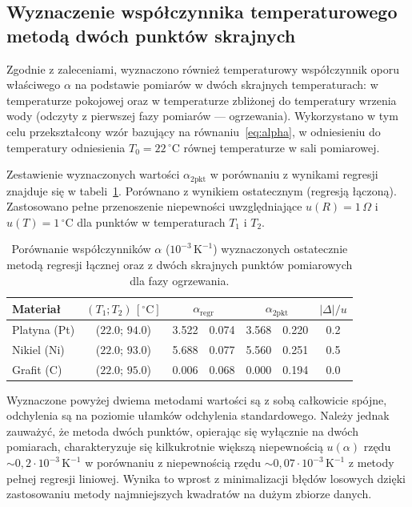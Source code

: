 \documentclass[12pt, a4paper]{article}
\begin{document}
\subsection{Wyznaczenie współczynnika temperaturowego metodą dwóch punktów skrajnych}\label{sec:2pkt}

Zgodnie z zaleceniami, wyznaczono również temperaturowy współczynnik oporu właściwego $\alpha$ na podstawie pomiarów w dwóch skrajnych temperaturach: w temperaturze pokojowej oraz w temperaturze zbliżonej do temperatury wrzenia wody (odczyty z pierwszej fazy pomiarów --- ogrzewania). Wykorzystano w tym celu przekształcony wzór bazujący na równaniu~\eqref{eq:alpha}, w odniesieniu do temperatury odniesienia $T_0 = 22\,^\circ\mathrm{C}$ równej temperaturze w sali pomiarowej. 

Zestawienie wyznaczonych wartości $\alpha_{\mathrm{2pkt}}$ w porównaniu z wynikami regresji znajduje się w tabeli~\ref{tab:alpha_2pkt}. Porównano z wynikiem ostatecznym (regresją łączoną). Zastosowano pełne przenoszenie niepewności uwzględniające $u(R) = 1\,\Omega$ i $u(T) = 1\,^\circ\mathrm{C}$ dla punktów w temperaturach $T_1$ i $T_2$.

\begin{table}[H]
\centering
\caption{Porównanie współczynników $\alpha$ ($10^{-3}\,\mathrm{K}^{-1}$) wyznaczonych ostatecznie metodą regresji łącznej oraz z dwóch skrajnych punktów pomiarowych dla fazy ogrzewania.}\label{tab:alpha_2pkt}
\begin{tabular}{l c r@{$\;\pm\;$}l r@{$\;\pm\;$}l c}
\toprule
Materiał & $(T_1; T_2)\,[^\circ\mathrm{C}]$ & \multicolumn{2}{c}{$\alpha_{\mathrm{regr}}$} & \multicolumn{2}{c}{$\alpha_{\mathrm{2pkt}}$} & $|\Delta|/u$ \\
\midrule
Platyna (Pt) & ($\num{22.0}$; $\num{94.0}$) & \num{3.522} & \num{0.074} & \num{3.568} & \num{0.220} & \num{0.2} \\
Nikiel (Ni)  & ($\num{22.0}$; $\num{93.0}$) & \num{5.688} & \num{0.077} & \num{5.560} & \num{0.251} & \num{0.5} \\
Grafit (C)   & ($\num{22.0}$; $\num{95.0}$) & \num{0.006} & \num{0.068} & \num{0.000} & \num{0.194} & \num{0.0} \\
\bottomrule
\end{tabular}
\end{table}

Wyznaczone powyżej dwiema metodami wartości są z sobą całkowicie spójne, odchylenia są na poziomie ułamków odchylenia standardowego. Należy jednak zauważyć, że metoda dwóch punktów, opierając się wyłącznie na dwóch pomiarach, charakteryzuje się kilkukrotnie większą niepewnością $u(\alpha)$ rzędu $\sim 0,2 \cdot 10^{-3}\,\mathrm{K}^{-1}$ w porównaniu z niepewnością rzędu $\sim 0,07 \cdot 10^{-3}\,\mathrm{K}^{-1}$ z metody pełnej regresji liniowej. Wynika to wprost z minimalizacji błędów losowych dzięki zastosowaniu metody najmniejszych kwadratów na dużym zbiorze danych.
\end{document}
